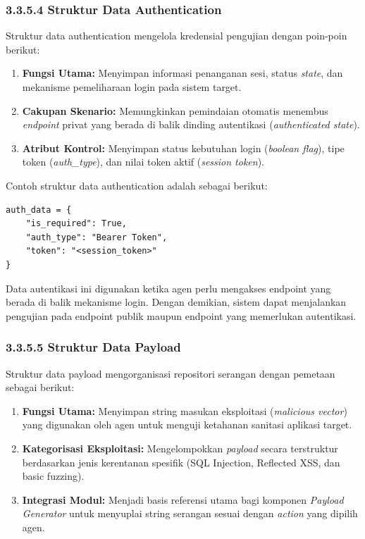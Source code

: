 \subsubsection{3.3.5.4 Struktur Data Authentication}

Struktur data authentication mengelola kredensial pengujian dengan poin-poin berikut:

\begin{enumerate}
    \item \textbf{Fungsi Utama:} Menyimpan informasi penanganan sesi, status \textit{state}, dan mekanisme pemeliharaan login pada sistem target.
    \item \textbf{Cakupan Skenario:} Memungkinkan pemindaian otomatis menembus \textit{endpoint} privat yang berada di balik dinding autentikasi (\textit{authenticated state}).
    \item \textbf{Atribut Kontrol:} Menyimpan status kebutuhan login (\textit{boolean flag}), tipe token (\textit{auth\_type}), dan nilai token aktif (\textit{session token}).
\end{enumerate}

Contoh struktur data authentication adalah sebagai berikut:

\begin{verbatim}
auth_data = {
    "is_required": True,
    "auth_type": "Bearer Token",
    "token": "<session_token>"
}
\end{verbatim}

Data autentikasi ini digunakan ketika agen perlu mengakses endpoint yang berada di balik mekanisme login. Dengan demikian, sistem dapat menjalankan pengujian pada endpoint publik maupun endpoint yang memerlukan autentikasi.

\subsubsection{3.3.5.5 Struktur Data Payload}

Struktur data payload mengorganisasi repositori serangan dengan pemetaan sebagai berikut:

\begin{enumerate}
    \item \textbf{Fungsi Utama:} Menyimpan string masukan eksploitasi (\textit{malicious vector}) yang digunakan oleh agen untuk menguji ketahanan sanitasi aplikasi target.
    \item \textbf{Kategorisasi Eksploitasi:} Mengelompokkan \textit{payload} secara terstruktur berdasarkan jenis kerentanan spesifik (SQL Injection, Reflected XSS, dan basic fuzzing).
    \item \textbf{Integrasi Modul:} Menjadi basis referensi utama bagi komponen \textit{Payload Generator} untuk menyuplai string serangan sesuai dengan \textit{action} yang dipilih agen.
\end{enumerate}


